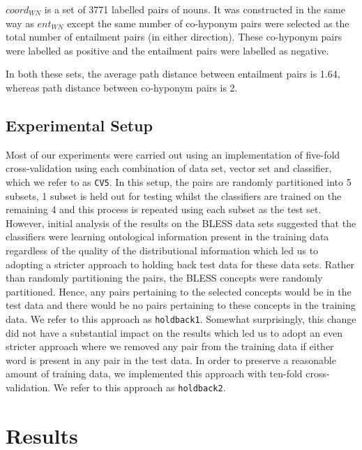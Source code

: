 \documentclass[11pt]{article}
\begin{document}
$coord_{WN}$ is a set of 3771 labelled pairs of nouns.  It was constructed in the same way as $ent_{WN}$ except the same number of co-hyponym pairs were selected as the total number of entailment pairs (in either direction).  These co-hyponym pairs were labelled as positive and the entailment pairs were labelled as negative.

In both these sets, the average path distance between entailment pairs is 1.64, whereas path distance between co-hyponym pairs is 2.

\subsection{Experimental Setup}

Most of our experiments were carried out using an implementation of five-fold cross-validation using each combination of data set, vector set and classifier, which we refer to as \texttt{CV5}.  In this setup, the pairs are randomly partitioned into 5 subsets, 1 subset is held out for testing whilst the classifiers are trained on the remaining 4 and this process is repeated using each subset as the test set.  However, initial analysis of the results on the BLESS data sets suggested that the classifiers were learning ontological information present in the training data regardless of the quality of the distributional information which led us to adopting a stricter approach to holding back test data for these data sets.  Rather than randomly partitioning the pairs, the BLESS concepts were randomly partitioned.  Hence, any pairs pertaining to the selected concepts would be in the test data and there would be no pairs pertaining to these concepts in the training data.  We refer to this approach as \texttt{holdback1}.  Somewhat surprisingly, this change did not have a substantial impact on the results which led us to adopt an even stricter approach where we removed any pair from the training data if either word is present in any pair in the test data.  In order to preserve a reasonable amount of training data, we implemented this approach with ten-fold cross-validation.  We refer to this approach as \texttt{holdback2}.

\section{Results}
\label{sect:results}
\end{document}
